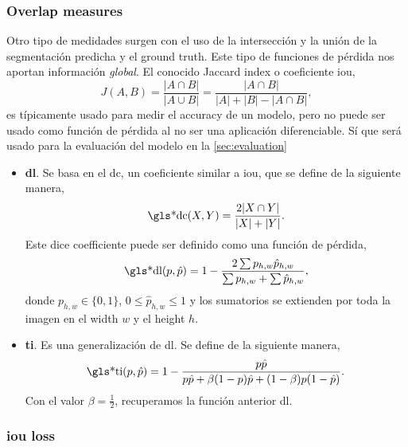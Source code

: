 \subsubsection{Overlap measures}
Otro tipo de medidades surgen con el uso de la intersección y la unión de la
segmentación predicha y el ground truth. Este tipo de funciones de pérdida nos
aportan información \emph{global}. El conocido Jaccard index o coeficiente \gls{iou},
\begin{equation}
  J(A,B) = \frac{|A \cap B|}{|A \cup B|}
  = \frac{|A \cap B|}{|A| + |B| - |A \cap B|},
\end{equation}
es típicamente usado para medir el accuracy de un modelo, pero no puede ser
usado como función de pérdida al no ser una aplicación diferenciable. Sí que
será usado para la evaluación del modelo en la \vref{sec:evaluation}

\begin{itemize}
  \item \textbf{\gls*{dl}}. Se basa en el \gls{dc}, un coeficiente similar a
  \gls{iou}, que se define de la siguiente manera,
  \begin{equation}
    \text{\gls*{dc}}(X, Y) = \frac{2|X \cap Y|}{|X| + |Y|}.
  \end{equation}
  Este dice coefficiente puede ser definido como una función de pérdida,
  \begin{equation}
    \text{\gls*{dl}}(p, \hat{p})
    = 1 - \frac{2\sum p_{h, w}\hat{p}_{h, w}}{\sum p_{h, w} + \sum \hat{p}_{h, w}},
  \end{equation}
  donde \(p_{h, w} \in \{0, 1\}\), \(0 \leq \hat{p}_{h, w} \leq 1\) y los
  sumatorios se extienden por toda la imagen en el width \(w\) y el height
  \(h\).
  \item \textbf{\gls*{ti}}. Es una generalización de \gls{dl}. Se define de la
  siguiente manera,
  \begin{equation}
    \text{\gls*{ti}}(p, \hat{p})
    = 1 - \frac{p\hat{p}}{p\hat{p} + \beta(1 - p)\hat{p} + (1 - \beta)p(1 - \hat{p})}.
  \end{equation}
  Con el valor \(\beta = \frac{1}{2}\), recuperamos la función anterior
  \gls{dl}.
\end{itemize}


\subsubsection{\gls*{iou} loss}

\cite{yu16:unitb}


